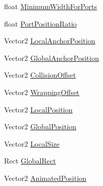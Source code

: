 \begin{DoxyCompactItemize}
\item 
float \hyperlink{classi_c_s___editor_object_a846fbfb791a69fa44e568c6b2eb8086c}{Minimum\+Width\+For\+Ports}
\item 
float \hyperlink{classi_c_s___editor_object_a8d0dc8fbd4da41b53d52477bd695fd65}{Port\+Position\+Ratio}
\item 
Vector2 \hyperlink{classi_c_s___editor_object_a4f1ef3bb56c3f5e7ae66982578f9d158}{Local\+Anchor\+Position}
\item 
Vector2 \hyperlink{classi_c_s___editor_object_a54adb6048e897120ee854c684e99a3ad}{Global\+Anchor\+Position}
\item 
Vector2 \hyperlink{classi_c_s___editor_object_af72e3d5b31ec5c94183e59fa77cde000}{Collision\+Offset}
\item 
Vector2 \hyperlink{classi_c_s___editor_object_a3c41c4ee9c5f52d5d91bb3ebeb106fee}{Wrapping\+Offset}
\item 
Vector2 \hyperlink{classi_c_s___editor_object_ad1e8c6712041588856383b29da35409c}{Local\+Position}
\item 
Vector2 \hyperlink{classi_c_s___editor_object_a357ff623b50ca4e5a2bd5367e0d93ee4}{Global\+Position}
\item 
Vector2 \hyperlink{classi_c_s___editor_object_a5c4ef242b4f19647a9981b9e8d9dff0b}{Local\+Size}
\item 
Rect \hyperlink{classi_c_s___editor_object_a0e49cd1cc74e53408eaf403758a891bb}{Global\+Rect}
\item 
Vector2 \hyperlink{classi_c_s___editor_object_a9b0ed49f07ba891a83df1c53df307724}{Animated\+Position}
\item 

\end{DoxyCompactItemize}
